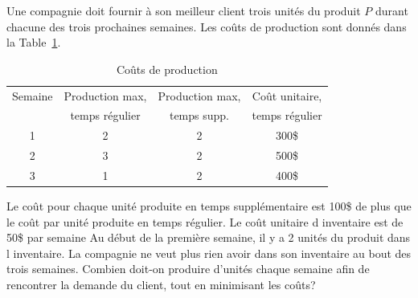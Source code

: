 \begin{example}
Une compagnie doit fournir à son meilleur client trois unités du produit $P$ durant chacune des trois prochaines semaines. Les coûts de production sont donnés dans la Table~\ref{tab:dynamic_costs}.
\begin{table}
\begin{center}
\begin{tabular}{|c|c|c|c|}
\hline
Semaine & Production max, & Production max, & Coût unitaire, \\
& temps régulier & temps supp. & temps régulier \\
\hline
1& 2 & 2 & 300\$ \\
\hline
2 & 3 & 2 & 500\$ \\
\hline
3 & 1 & 2 & 400\$ \\
\hline
\end{tabular}
\caption{Coûts de production}
\label{tab:dynamic_costs}
\end{center}
\end{table}
Le coût pour chaque unité produite en temps supplémentaire est 100\$ de plus que le coût par unité produite en temps régulier.
Le coût unitaire d inventaire est de 50\$ par semaine
Au début de la première semaine, il y a 2 unités du produit dans l inventaire.
La compagnie ne veut plus rien avoir dans son inventaire au bout des trois semaines.
Combien doit-on produire d'unités chaque semaine afin de rencontrer la demande du client, tout en minimisant les coûts?


\end{example}
